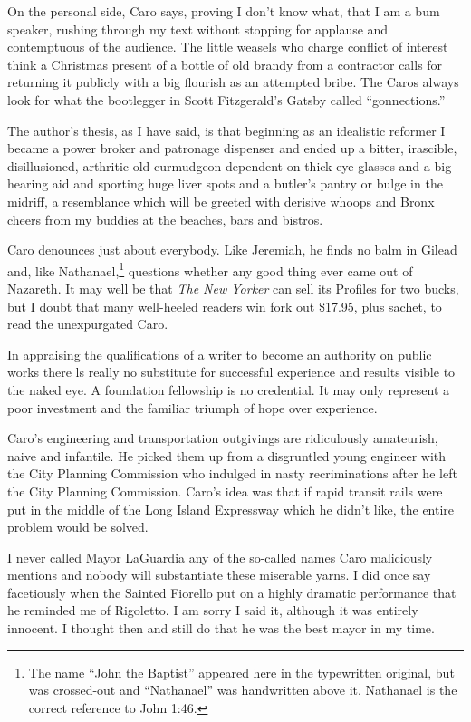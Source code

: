 \documentclass[11pt,letterpaper]{article}
\begin{document}
On the personal side, Caro says, proving I don't know what, that I am a bum speaker, rushing through my text without stopping for applause and contemptuous of the audience. The little weasels who charge conflict of interest think a Christmas present of a bottle of old brandy from a contractor calls for returning it publicly with a big flourish as an attempted bribe. The Caros always look for what the bootlegger in Scott Fitzgerald's Gatsby called \enquote{gonnections.}

The author's thesis, as I have said, is that beginning as an idealistic reformer I became a power broker and patronage dispenser and ended up a bitter, irascible, disillusioned, arthritic old curmudgeon dependent on thick eye glasses and a big hearing aid and sporting huge liver spots and a butler's pantry or bulge in the midriff, a resemblance which will be greeted with derisive whoops and Bronx cheers from my buddies at the beaches, bars and bistros.

Caro denounces just about everybody. Like Jeremiah, he finds no balm in Gilead and, like Nathanael,\footnote{The name \enquote{John the Baptist} appeared here in the typewritten original, but was crossed-out and \enquote{Nathanael} was handwritten above it. Nathanael is the correct reference to John 1:46.} questions whether any good thing ever came out of Nazareth. It may well be that \textit{The New Yorker} can sell its Profiles for two bucks, but I doubt that many well-heeled readers win fork out \$17.95, plus sachet, to read the unexpurgated Caro.

In appraising the qualifications of a writer to become an authority on public works there ls really no substitute for successful experience and results visible to the naked eye. A foundation fellowship is no credential. It may only represent a poor investment and the familiar triumph of hope over experience.

Caro's engineering and transportation outgivings are ridiculously amateurish, naive and infantile. He picked them up from a disgruntled young engineer with the City Planning Commission who indulged in nasty recriminations after he left the City Planning Commission. Caro's idea was that if rapid transit rails were put in the middle of the Long Island Expressway which he didn't like, the entire problem would be solved.

I never called Mayor LaGuardia any of the so-called names Caro maliciously mentions and nobody will substantiate these miserable yarns. I did once say facetiously when the Sainted Fiorello put on a highly dramatic performance that he reminded me of Rigoletto. I am sorry I said it, although it was entirely innocent. I thought then and still do that he was the best mayor in my time.
\end{document}
